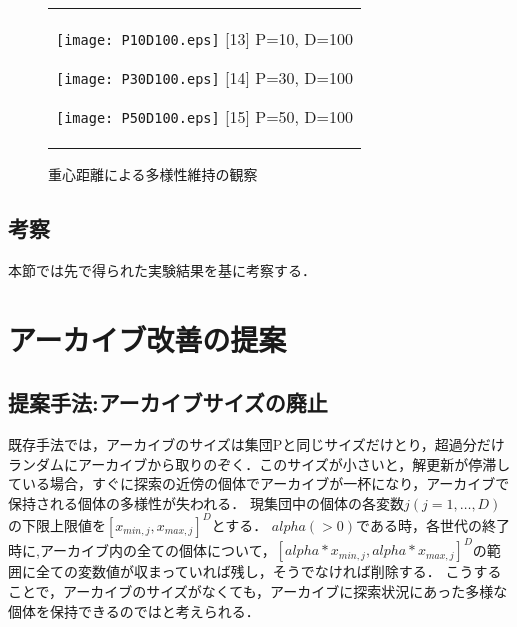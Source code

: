 \documentclass[a4paper,11pt,oneside,openany]{jsbook}
\begin{document}
\begin{figure}[htbp]
  \begin{center}
    \begin{tabular}{c}


      \begin{minipage}{0.33\hsize}
        \begin{center}
          \texttt{[image: P10D100.eps]}
          \hspace{1.2cm} [13] P=10, D=100
        \end{center}
      \end{minipage}

      \begin{minipage}{0.33\hsize}
        \begin{center}
          \texttt{[image: P30D100.eps]}
          \hspace{1.2cm} [14] P=30, D=100
        \end{center}
      \end{minipage}

      \begin{minipage}{0.33\hsize}
        \begin{center}
          \texttt{[image: P50D100.eps]}
          \hspace{1.2cm} [15] P=50, D=100
        \end{center}
      \end{minipage}
    \end{tabular}
    \caption{重心距離による多様性維持の観察}
    \label{fig:lena}
  \end{center}
\end{figure}


\section{考察}
本節では先で得られた実験結果を基に考察する．

\chapter{アーカイブ改善の提案}
\section{提案手法:アーカイブサイズの廃止}
既存手法では，アーカイブのサイズは集団Pと同じサイズだけとり，超過分だけランダムにアーカイブから取りのぞく．このサイズが小さいと，解更新が停滞している場合，すぐに探索の近傍の個体でアーカイブが一杯になり，アーカイブで保持される個体の多様性が失われる．
現集団中の個体の各変数$j(j = 1, \dots,D)$の下限上限値を$[x_{min,j},x_{max,j}]^D$とする．
$alpha(>0)$である時，各世代の終了時に,アーカイブ内の全ての個体について，$[alpha *x_{min,j},alpha*x_{max,j}]^D$の範囲に全ての変数値が収まっていれば残し，そうでなければ削除する．
こうすることで，アーカイブのサイズがなくても，アーカイブに探索状況にあった多様な個体を保持できるのではと考えられる．
\end{document}
